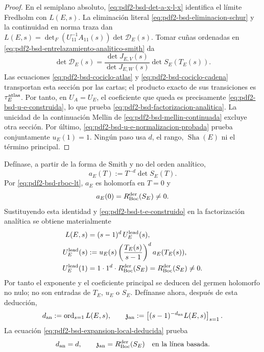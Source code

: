 \begin{proof}
En el semiplano absoluto,
\eqref{eq:pdf2-bsd-det-a-x-l-x} identifica el límite Fredholm con $L(E,s)$.
La eliminación literal \eqref{eq:pdf2-bsd-eliminacion-schur} y la continuidad
en norma traza dan
$L(E,s)=\det_F(U_{11}^{-1}A_{11}(s))\det\mathscr D_E(s)$.
Tomar cuñas ordenadas en
\eqref{eq:pdf2-bsd-entrelazamiento-analitico-smith} da
\[
 \det\mathscr D_E(s)
 =\frac{\det J_{E,V}(s)}
        {\det J_{E,W}(s)}
   \det S_E(T_E(s)).
\]
Las ecuaciones \eqref{eq:pdf2-bsd-cociclo-atlas} y
\eqref{eq:pdf2-bsd-cociclo-cadena} transportan esta sección por las cartas;
el producto exacto de sus transiciones es $\tau_E^{\rm atlas}$. Por tanto, en
$U_A=U_E$, el coeficiente que queda es precisamente
\eqref{eq:pdf2-bsd-u-e-construida}, lo que prueba
\eqref{eq:pdf2-bsd-factorizacion-analitica}. La unicidad de la continuación
Mellin de \eqref{eq:pdf2-bsd-mellin-continuada} excluye otra sección. Por
último, \eqref{eq:pdf2-bsd-u-e-normalizacion-probada} prueba conjuntamente
$u_E(1)=1$. Ningún paso usa $d$, el rango, $\operatorname{Sha}(E)$ ni el
término principal.
\end{proof}

Defínase, a partir de la forma de Smith y no del orden analítico,
\begin{equation}\label{eq:pdf2-bsd-a-e-smith}
 a_E(T):=T^{-d}\det S_E(T).
\end{equation}
Por \eqref{eq:pdf2-bsd-rboc-lt}, $a_E$ es holomorfa en $T=0$ y
\begin{equation}\label{eq:pdf2-bsd-a-e-cero}
 a_E(0)=R_{\rm Boc}^{\rm der}(S_E)\ne0.
\end{equation}
Sustituyendo esta identidad y
\eqref{eq:pdf2-bsd-t-e-construido} en la factorización analítica se obtiene
materialmente
\begin{equation}\label{eq:pdf2-bsd-expansion-local-deducida}
 \begin{aligned}
 L(E,s)
  &=(s-1)^d\,U_E^{\rm lead}(s),\\
 U_E^{\rm lead}(s)
  &:=u_E(s)
     \left(\frac{T_E(s)}{s-1}\right)^d
     a_E(T_E(s)),\\
 U_E^{\rm lead}(1)
  &=1\cdot1^d\cdot R_{\rm Boc}^{\rm der}(S_E)
   =R_{\rm Boc}^{\rm der}(S_E)\ne0.
 \end{aligned}
\end{equation}
Por tanto el exponente y el coeficiente principal se deducen del germen
holomorfo no nulo; no son entradas de $T_E$, $u_E$ o $S_E$.
Defínanse ahora, después de esta deducción,
\begin{equation}\label{eq:pdf2-bsd-dan-zan}
 d_{\rm an}:=\operatorname{ord}_{s=1}L(E,s),
 \qquad
 \mathfrak z_{\rm an}:=
 \left[(s-1)^{-d_{\rm an}}L(E,s)\right]_{s=1}.
\end{equation}
La ecuación \eqref{eq:pdf2-bsd-expansion-local-deducida} prueba
\begin{equation}\label{eq:pdf2-bsd-dan-d}
 d_{\rm an}=d,
 \qquad
 \mathfrak z_{\rm an}
 =R_{\rm Boc}^{\rm der}(S_E)
 \quad\text{en la línea basada}.
\end{equation}

